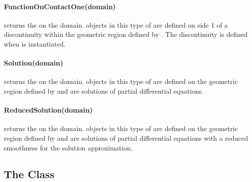 %
\paragraph{FunctionOnContactOne(domain)}
returns the \FunctionOnContactOne on the \Domain domain. \Data objects in
    this type of \Function are defined on side 1 of a discontinuity within
    the geometric region defined by .
    The discontinuity is defined when  is instantiated.

%
\paragraph{Solution(domain)}
returns the \SolutionFS on the \Domain domain. \Data objects in this type
    of \Function are defined on the geometric region defined by 
    and are solutions of partial differential equations.

%
\paragraph{ReducedSolution(domain)}
returns the \ReducedSolutionFS on the \Domain domain. \Data objects in
    this type of \Function are defined on the geometric region defined by
     and are solutions of partial differential
    equations with a reduced smoothness
    for the solution approximation.


\subsection{The \Data Class}
\label{SEC ESCRIPT DATA}

